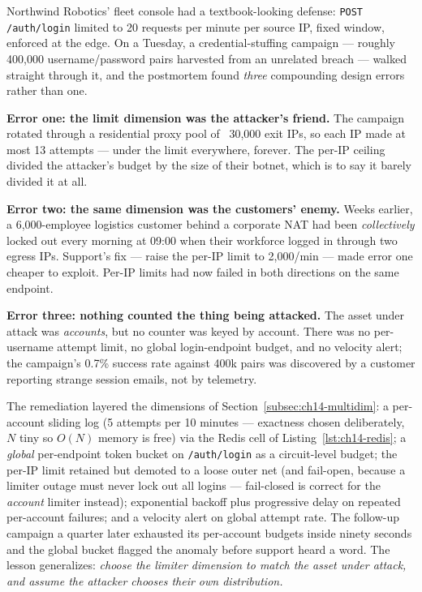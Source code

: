 Northwind Robotics' fleet console had a textbook-looking defense:
\texttt{POST /auth/login} limited to 20 requests per minute per source IP,
fixed window, enforced at the edge. On a Tuesday, a credential-stuffing
campaign --- roughly 400{,}000 username/password pairs harvested from an
unrelated breach --- walked straight through it, and the postmortem found
\emph{three} compounding design errors rather than one.

\textbf{Error one: the limit dimension was the attacker's friend.} The
campaign rotated through a residential proxy pool of ~30{,}000 exit IPs, so
each IP made at most 13 attempts --- under the limit everywhere, forever.
The per-IP ceiling divided the attacker's budget by the size of their
botnet, which is to say it barely divided it at all.

\textbf{Error two: the same dimension was the customers' enemy.} Weeks
earlier, a 6{,}000-employee logistics customer behind a corporate NAT had
been \emph{collectively} locked out every morning at 09:00 when their
workforce logged in through two egress IPs. Support's fix --- raise the
per-IP limit to 2{,}000/min --- made error one cheaper to exploit. Per-IP
limits had now failed in both directions on the same endpoint.

\textbf{Error three: nothing counted the thing being attacked.} The asset
under attack was \emph{accounts}, but no counter was keyed by account.
There was no per-username attempt limit, no global login-endpoint budget,
and no velocity alert; the campaign's 0.7\% success rate against 400k pairs
was discovered by a customer reporting strange session emails, not by
telemetry.

The remediation layered the dimensions of
Section~\ref{subsec:ch14-multidim}: a per-account sliding log (5 attempts
per 10 minutes --- exactness chosen deliberately, $N$ tiny so $O(N)$ memory
is free) via the Redis cell of Listing~\ref{lst:ch14-redis}; a
\emph{global} per-endpoint token bucket on \texttt{/auth/login} as a
circuit-level budget; the per-IP limit retained but demoted to a loose
outer net (and fail-open, because a limiter outage must never lock out all
logins --- fail-closed is correct for the \emph{account} limiter instead);
exponential backoff plus progressive delay on repeated per-account
failures; and a velocity alert on global attempt rate. The follow-up
campaign a quarter later exhausted its per-account budgets inside ninety
seconds and the global bucket flagged the anomaly before support heard a
word. The lesson generalizes: \emph{choose the limiter dimension to match
the asset under attack, and assume the attacker chooses their own
distribution.}

